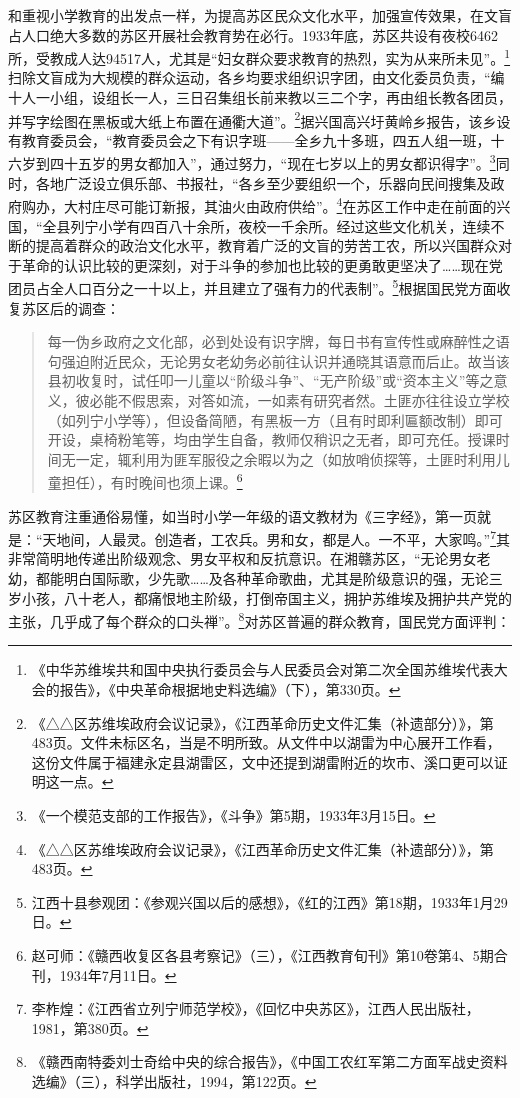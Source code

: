 和重视小学教育的出发点一样，为提高苏区民众文化水平，加强宣传效果，在文盲占人口绝大多数的苏区开展社会教育势在必行。1933年底，苏区共设有夜校6462所，受教成人达94517人，尤其是“妇女群众要求教育的热烈，实为从来所未见”。\footnote{《中华苏维埃共和国中央执行委员会与人民委员会对第二次全国苏维埃代表大会的报告》，《中央革命根据地史料选编》（下），第330页。}扫除文盲成为大规模的群众运动，各乡均要求组织识字团，由文化委员负责，“编十人一小组，设组长一人，三日召集组长前来教以三二个字，再由组长教各团员，并写字绘图在黑板或大纸上布置在通衢大道”。\footnote{《△△区苏维埃政府会议记录》，《江西革命历史文件汇集（补遗部分）》，第483页。文件未标区名，当是不明所致。从文件中以湖雷为中心展开工作看，这份文件属于福建永定县湖雷区，文中还提到湖雷附近的坎市、溪口更可以证明这一点。}据兴国高兴圩黄岭乡报告，该乡设有教育委员会，“教育委员会之下有识字班——全乡九十多班，四五人组一班，十六岁到四十五岁的男女都加入”，通过努力，“现在七岁以上的男女都识得字”。\footnote{《一个模范支部的工作报告》，《斗争》第5期，1933年3月15日。}同时，各地广泛设立俱乐部、书报社，“各乡至少要组织一个，乐器向民间搜集及政府购办，大村庄尽可能订新报，其油火由政府供给”。\footnote{《△△区苏维埃政府会议记录》，《江西革命历史文件汇集（补遗部分）》，第483页。}在苏区工作中走在前面的兴国，“全县列宁小学有四百八十余所，夜校一千余所。经过这些文化机关，连续不断的提高着群众的政治文化水平，教育着广泛的文盲的劳苦工农，所以兴国群众对于革命的认识比较的更深刻，对于斗争的参加也比较的更勇敢更坚决了……现在党团员占全人口百分之一十以上，并且建立了强有力的代表制”。\footnote{江西十县参观团：《参观兴国以后的感想》，《红的江西》第18期，1933年1月29日。}根据国民党方面收复苏区后的调查：

\begin{quote}

每一伪乡政府之文化部，必到处设有识字牌，每日书有宣传性或麻醉性之语句强迫附近民众，无论男女老幼务必前往认识并通晓其语意而后止。故当该县初收复时，试任叩一儿童以“阶级斗争”、“无产阶级”或“资本主义”等之意义，彼必能不假思索，对答如流，一如素有研究者然。土匪亦往往设立学校（如列宁小学等），但设备简陋，有黑板一方（且有时即利匾额改制）即可开设，桌椅粉笔等，均由学生自备，教师仅稍识之无者，即可充任。授课时间无一定，辄利用为匪军服役之余暇以为之（如放哨侦探等，土匪时利用儿童担任），有时晚间也须上课。\footnote{赵可师：《赣西收复区各县考察记》（三），《江西教育旬刊》第10卷第4、5期合刊，1934年7月11日。}
\end{quote}


苏区教育注重通俗易懂，如当时小学一年级的语文教材为《三字经》，第一页就是：“天地间，人最灵。创造者，工农兵。男和女，都是人。一不平，大家鸣。”\footnote{李柞煌：《江西省立列宁师范学校》，《回忆中央苏区》，江西人民出版社，1981，第380页。}其非常简明地传递出阶级观念、男女平权和反抗意识。在湘赣苏区，“无论男女老幼，都能明白国际歌，少先歌……及各种革命歌曲，尤其是阶级意识的强，无论三岁小孩，八十老人，都痛恨地主阶级，打倒帝国主义，拥护苏维埃及拥护共产党的主张，几乎成了每个群众的口头禅”。\footnote{《赣西南特委刘士奇给中央的综合报告》，《中国工农红军第二方面军战史资料选编》（三），科学出版社，1994，第122页。}对苏区普遍的群众教育，国民党方面评判：

